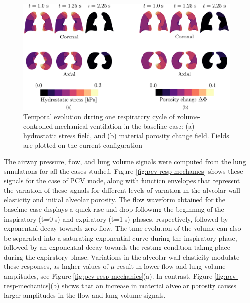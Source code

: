 \documentclass[preprint,3p,12pt,number,sort&compress]{elsarticle}
\begin{document}
\begin{figure}[h!]
    \begin{center}
    \includegraphics[width=1 \textwidth]{./Figures/hydpor.pdf}
    \caption[]{Temporal evolution during one respiratory cycle of volume-controlled
mechanical ventilation in the  baseline case: (a) hydrostatic stress field, and (b) material porosity change field. Fields are plotted on the current configuration}
    \label{fig:hyd-por-field}
    \end{center}
\end{figure}


The airway pressure, flow, and lung volume signals were computed from the lung simulations for all the cases studied. Figure \ref{fig:pcv-resp-mechanics} shows these signals for the case of PCV mode, along with function envelopes that represent the variation of these signals for different levels of variation in the alveolar-wall elasticity and initial alveolar porosity. The flow waveform obtained for the baseline case displays a quick rise and drop following the beginning of the inspiratory (t=0 s) and expiratory (t=1 s) phases, respectively, followed by exponential decay towards zero flow. The time evolution of the volume can also be separated into a saturating exponential curve during the inspiratory phase, followed by an exponential decay towards the resting condition taking place during the expiratory phase. Variations in the alveolar-wall elasticity modulate these responses, as higher values of $\mu$ result in lower flow and lung volume amplitudes, see Figure \ref{fig:pcv-resp-mechanics}(a). In contrast, Figure \ref{fig:pcv-resp-mechanics}(b) shows that an increase in material alveolar porosity causes larger amplitudes in the flow and lung volume signals. 
\end{document}
